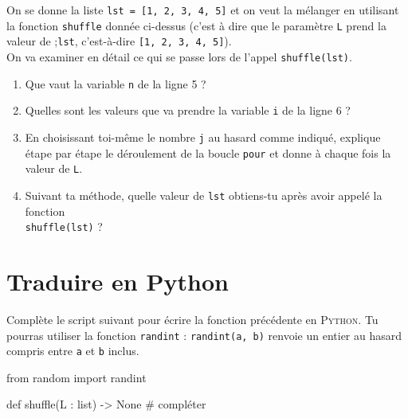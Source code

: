 \documentclass[a4paper,12pt]{book}
\begin{document}
On se donne la liste \texttt{lst = [1, 2, 3, 4, 5]} et on veut la mélanger en utilisant la fonction \texttt{shuffle} donnée ci-dessus (c'est à dire que le paramètre \texttt{L} prend la valeur de ;\texttt{lst}, c'est-à-dire \texttt{[1, 2, 3, 4, 5]}).\\
On va examiner en détail ce qui se passe lors de l'appel \texttt{shuffle(lst)}.
\begin{enumerate}[\bfseries 1.]
	\item Que vaut la variable \texttt{n} de la ligne 5 ?\bareme{1pt}
    \item Quelles sont les valeurs que va prendre la variable \texttt{i} de la ligne 6 ?\bareme{1pt}
    \item En choisissant toi-même le nombre \texttt{j} au hasard comme indiqué, explique étape par étape le déroulement de la boucle \texttt{pour} et donne à chaque fois la valeur de \texttt{L}.
    \item Suivant ta méthode, quelle valeur de \texttt{lst} obtiens-tu après avoir appelé la fonction\\ \texttt{shuffle(lst)} ? \bareme{1pt}
\end{enumerate}

\section{Traduire en Python}

Complète le script suivant pour écrire la fonction précédente en \textsc{Python}. Tu pourras utiliser la fonction \texttt{randint} : \texttt{randint(a, b)} renvoie un entier au hasard compris entre \texttt{a} et \texttt{b} inclus.

\begin{pythoncode}
from random import randint

def shuffle(L : list) -> None
    # compléter
\end{pythoncode}
\end{document}
